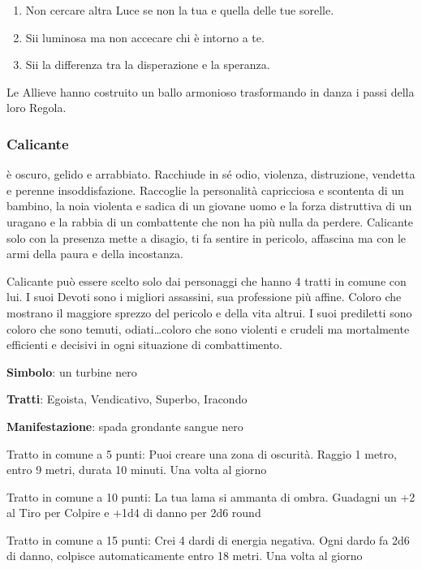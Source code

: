 \documentclass[a4paper,11pt,twoside,openany]{book}
\begin{document}
{\begin{enumerate}
	\item Non cercare altra Luce se non la tua e quella delle tue sorelle.

	\item Sii luminosa ma non accecare chi è intorno a te.

	\item Sii la differenza tra la disperazione e la speranza.
\end{enumerate}

Le Allieve hanno costruito un ballo armonioso trasformando in danza i passi della loro Regola.

\subsubsection{Calicante}

\label{calicante}

è oscuro, gelido e arrabbiato. Racchiude in sé odio, violenza, distruzione, vendetta e perenne insoddisfazione. Raccoglie la personalità capricciosa e scontenta di un bambino, la noia violenta e sadica di un giovane uomo e la forza distruttiva di un uragano e la rabbia di un combattente che non ha più nulla da perdere. Calicante solo con la presenza mette a disagio, ti fa sentire in pericolo, affascina ma con le armi della paura e della incostanza.

Calicante può essere scelto solo dai personaggi che hanno 4 tratti in comune con lui. I suoi Devoti sono i migliori assassini, sua professione più affine. Coloro che mostrano il maggiore sprezzo del pericolo e della vita altrui. I suoi prediletti sono coloro che sono temuti, odiati\ldots coloro che sono violenti e crudeli ma mortalmente efficienti e decisivi in ogni situazione di combattimento.

\textbf{Simbolo}: un turbine nero

\textbf{Tratti}: Egoista, Vendicativo, Superbo, Iracondo

\textbf{Manifestazione}: spada grondante sangue nero

\bigskip

Tratto in comune a 5 punti: Puoi creare una zona di oscurità. Raggio 1 metro, entro 9 metri, durata 10 minuti. Una volta al giorno

Tratto in comune a 10 punti: La tua lama si ammanta di ombra. Guadagni un +2 al Tiro per Colpire e +1d4 di danno per 2d6 round

Tratto in comune a 15 punti: Crei 4 dardi di energia negativa. Ogni dardo fa 2d6 di danno, colpisce automaticamente entro 18 metri. Una volta al giorno

}
\end{document}
